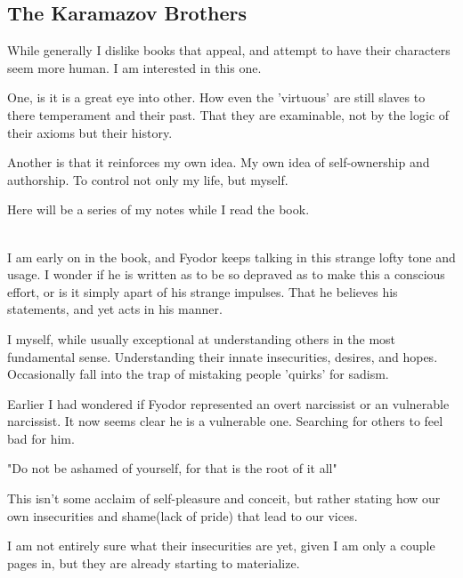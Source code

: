 \subsection{The Karamazov Brothers}
\par While generally I dislike books that appeal, and attempt to have their characters seem more human. I am interested in this one. 
\par One, is it is a great eye into other. How even the 'virtuous' are still slaves to there temperament and their past. That they are examinable, not by the logic of their axioms but their history.
\par Another is that it reinforces my own idea. My own idea of self-ownership and authorship. To control not only my life, but myself.
\par Here will be a series of my notes while I read the book.
\\
\\
\par I am early on in the book, and Fyodor keeps talking in this strange lofty tone and usage. I wonder if he is written as to be so depraved as to make this a conscious effort, or is it simply apart of his strange impulses. That he believes his statements, and yet acts in his manner.
\par I myself, while usually exceptional at understanding others in the most fundamental sense. Understanding their innate insecurities, desires, and hopes. Occasionally fall into the trap of mistaking people 'quirks' for sadism.
\\ 
\par Earlier I had wondered if Fyodor represented an overt narcissist or an vulnerable narcissist. It now seems clear he is a vulnerable one. Searching for others to feel bad for him.
\\
\par "Do not be ashamed of yourself, for that is the root of it all"
\par This isn't some acclaim of self-pleasure and conceit, but rather stating how our own insecurities and shame(lack of pride) that lead to our vices.
\par I am not entirely sure what their insecurities are yet, given I am only a couple pages in, but they are already starting to materialize.

\\

